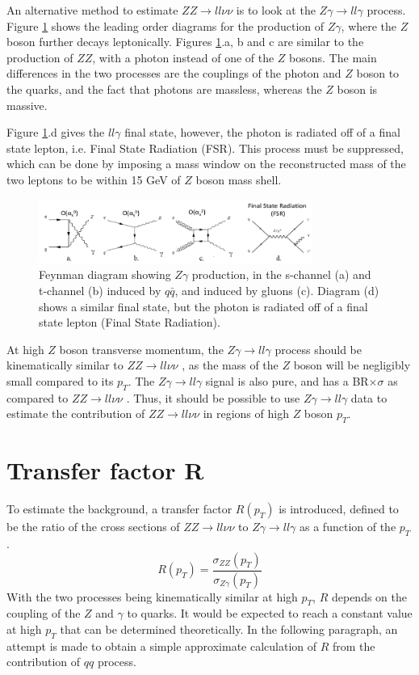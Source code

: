 \documentclass[11pt,a4paper,openright,twoside]{report}
\newcommand{\ZZ}{$ZZ\to ll\nu\nu$ }
\newcommand{\Zg}{$Z\gamma\to ll\gamma$ }
\begin{document}
An alternative method to estimate \ZZ is to look at the \Zg process. Figure \ref{fig:Zg} shows the leading order diagrams for the production of $Z\gamma$, where the $Z$ boson further decays leptonically. Figures \ref{fig:Zg}.a, b and c are similar to the production of $ZZ$, with a photon instead of one of the $Z$ bosons. The main differences in the two processes are the couplings of the photon and $Z$ boson to the quarks, and the fact that photons are massless, whereas the $Z$ boson is massive. 

Figure \ref{fig:Zg}.d gives the $ll\gamma$ final state, however, the photon is radiated off of a final state lepton, i.e. Final State Radiation (FSR). This process must be suppressed, which can be done by imposing a mass window on the reconstructed mass of the two leptons to be within 15 GeV of $Z$ boson mass shell.

\begin{figure}[H]
\centering
		\includegraphics[width=0.8\textwidth]{Zg.png}
		\caption{Feynman diagram showing $Z\gamma$ production, in the s-channel (a) and t-channel (b) induced by $q\bar{q}$, and induced by gluons (c). Diagram (d) shows a similar final state, but the photon is radiated off of a final state lepton (Final State Radiation).}
		\label{fig:Zg}
\end{figure}

At high $Z $ boson transverse momentum, the \Zg process should be kinematically similar to \ZZ, as the mass of the $Z$ boson will be negligibly small compared to its $p_T$. The \Zg signal is also pure, and has a BR$\times\sigma$ as compared to \ZZ. Thus, it should be possible to use \Zg data to estimate the contribution of \ZZ in regions of high $Z$ boson $p_T$.

\section{Transfer factor R}
To estimate the background, a transfer factor $R(p_T)$ is introduced, defined to be the ratio of the cross sections of \ZZ to \Zg as a function of the $p_T$.
\begin{equation}
	R(p_{T}) = \frac{\sigma_{ZZ}(p_{T})}{\sigma_{Z\gamma}(p_T)}
\end{equation}
With the two processes being kinematically similar at high $p_T$, $R$ depends on the coupling of the $Z$ and $\gamma$ to quarks. It would be expected to reach a constant value at high $p_T$ that can be determined theoretically. In the following paragraph, an attempt is made to obtain a simple approximate calculation of $R$ from the contribution of $qq$ process.
\end{document}

